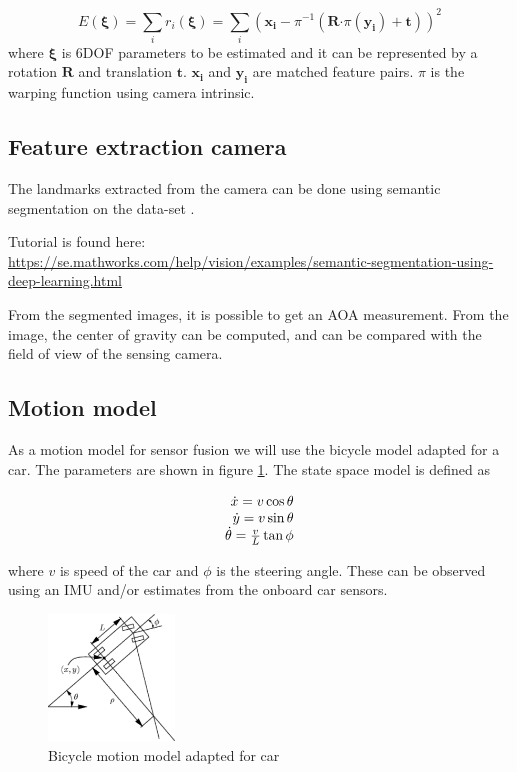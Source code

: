 	\begin{equation} \label{eq:pnp}
	E (\bm{\xi}) = \sum_i r_i(\bm{\xi}) = \sum_i ( \bm{x_i} - \pi^{-1}( \mathbf{R} \mathbf{\cdot} \pi(\bm{y_i}) + \mathbf{t}))^2
	\end{equation}
 where $\bm{\xi}$ is 6DOF parameters to be estimated and it can be represented by a rotation $\mathbf{R}$ and translation $\mathbf{t}$. $\bm{x_i}$ and $\bm{y_i}$ are matched feature pairs. $\pi$ is the warping function using camera intrinsic. 
 

\subsection{Feature extraction camera}

The landmarks extracted from the camera can be done using semantic
segmentation on the data-set \cite{Brostow:2009:SOC:1464534.1465403}.

Tutorial is found here:
\url{https://se.mathworks.com/help/vision/examples/semantic-segmentation-using-deep-learning.html}

From the segmented images, it is possible to get an \gls{AOA}
measurement. From the image, the center of gravity can be computed,
and can be compared with the field of view of the sensing camera.

\subsection{Motion model}
As a motion model for sensor fusion we will use the bicycle model adapted for a car.
The parameters are shown in figure \ref{fig:motion_model}. The state space model is defined as

\begin{equation}
 \begin{array}[b]{r}
  \dot{x} = v \cos \theta \\
  \dot{y} = v \sin \theta \\
  \dot{\theta} = \frac{v}{L} \tan{\phi}
 \end{array}
\end{equation}

where $v$ is speed of the car and $\phi$ is the steering angle. 
These can be observed using an IMU and/or estimates from the onboard car sensors.


\begin{figure}
\label{fig:motion_model}
\includegraphics[width=0.3\textwidth]{figures/bicycle_model.pdf}
\caption{Bicycle motion model adapted for car}
\end{figure}



